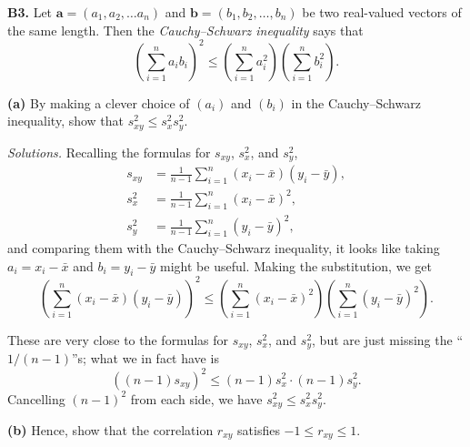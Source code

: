 \documentclass[
  a4paper,
]{book}
\theoremstyle{definition}
\theoremstyle{definition}
\theoremstyle{definition}
\theoremstyle{definition}
\theoremstyle{remark}
\begin{document}
\textbf{B3.} Let \(\mathbf a = (a_1, a_2, \dots a_n)\) and \(\mathbf b = (b_1, b_2, \dots, b_n)\) be two real-valued vectors of the same length. Then the \emph{Cauchy--Schwarz inequality} says that
\[ \left( \sum_{i=1}^n a_i b_i \right)^2 \leq \left( \sum_{i=1}^n a_i^2 \right) \left(\sum_{i=1}^n b_i^2 \right) . \]

\textbf{(a)} By making a clever choice of \((a_i)\) and \((b_i)\) in the Cauchy--Schwarz inequality, show that \(s_{xy}^2 \leq s_x^2 s_y^2\).

\begin{myanswers}
\emph{Solutions.}
Recalling the formulas for \(s_{xy}\), \(s_x^2\), and \(s_y^2\),
\begin{align*}
s_{xy} &= \frac{1}{n-1} \sum_{i=1}^n (x_i - \bar x)(y_i - \bar y) ,\\
s_{x}^2 &= \frac{1}{n-1} \sum_{i=1}^n (x_i - \bar x)^2 ,\\
s_{y}^2 &= \frac{1}{n-1} \sum_{i=1}^n (y_i - \bar y)^2 ,
\end{align*}
and comparing them with the Cauchy--Schwarz inequality, it looks like taking \(a_i = x_i - \bar x\) and \(b_i = y_i - \bar y\) might be useful. Making the substitution, we get
\[ \left( \sum_{i=1}^n (x_i - \bar x)(y_i - \bar y) \right)^2 \leq \left( \sum_{i=1}^n (x_i - \bar x)^2 \right) \left(\sum_{i=1}^n (y_i - \bar y)^2 \right) . \]

These are very close to the formulas for \(s_{xy}\), \(s_x^2\), and \(s_y^2\), but are just missing the ``\(1/(n-1)\)''s; what we in fact have is
\[ \left( (n-1) s_{xy} \right)^2 \leq (n-1)s_x^2 \cdot (n-1) s_y^2 .\]
Cancelling \((n-1)^2\) from each side, we have \(s_{xy}^2 \leq s_x^2 s_y^2\).

\end{myanswers}

\textbf{(b)}
Hence, show that the correlation \(r_{xy}\) satisfies \(-1 \leq r_{xy} \leq 1\).
\end{document}
